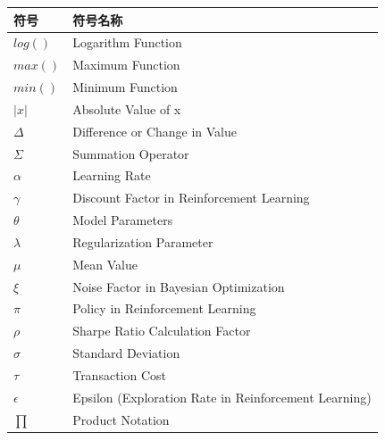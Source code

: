 \begin{tabular}{ll}
\toprule
符号 & 符号名称 \\
\midrule
$log()$ & Logarithm Function \\
$max()$ & Maximum Function \\
$min()$ & Minimum Function \\
$|x|$ & Absolute Value of x \\
$\Delta$ & Difference or Change in Value \\
$\Sigma$ & Summation Operator \\
$\alpha$ & Learning Rate \\
$\gamma$ & Discount Factor in Reinforcement Learning \\
$\theta$ & Model Parameters \\
$\lambda$ & Regularization Parameter \\
$\mu$ & Mean Value \\
$\xi$ & Noise Factor in Bayesian Optimization \\
$\pi$ & Policy in Reinforcement Learning \\
$\rho$ & Sharpe Ratio Calculation Factor \\
$\sigma$ & Standard Deviation \\
$\tau$ & Transaction Cost \\
$\epsilon$ & Epsilon (Exploration Rate in Reinforcement Learning) \\
$\prod$ & Product Notation \\
\bottomrule
\end{tabular}


